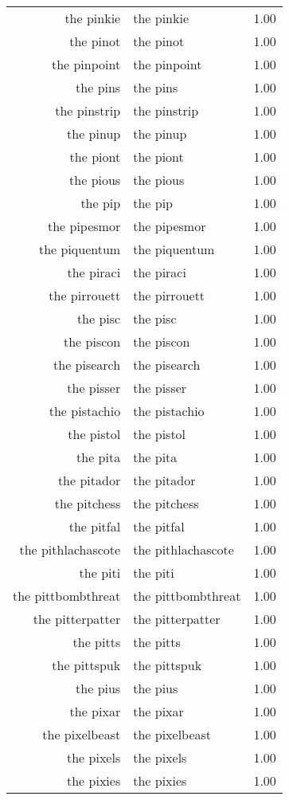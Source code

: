 \begin{table}[ht]
\begin{tabular}{rlr}
  the pinkie & the pinkie & 1.00 \\ 
  the pinot & the pinot & 1.00 \\ 
  the pinpoint & the pinpoint & 1.00 \\ 
  the pins & the pins & 1.00 \\ 
  the pinstrip & the pinstrip & 1.00 \\ 
  the pinup & the pinup & 1.00 \\ 
  the piont & the piont & 1.00 \\ 
  the pious & the pious & 1.00 \\ 
  the pip & the pip & 1.00 \\ 
  the pipesmor & the pipesmor & 1.00 \\ 
  the piquentum & the piquentum & 1.00 \\ 
  the piraci & the piraci & 1.00 \\ 
  the pirrouett & the pirrouett & 1.00 \\ 
  the pisc & the pisc & 1.00 \\ 
  the piscon & the piscon & 1.00 \\ 
  the pisearch & the pisearch & 1.00 \\ 
  the pisser & the pisser & 1.00 \\ 
  the pistachio & the pistachio & 1.00 \\ 
  the pistol & the pistol & 1.00 \\ 
  the pita & the pita & 1.00 \\ 
  the pitador & the pitador & 1.00 \\ 
  the pitchess & the pitchess & 1.00 \\ 
  the pitfal & the pitfal & 1.00 \\ 
  the pithlachascote & the pithlachascote & 1.00 \\ 
  the piti & the piti & 1.00 \\ 
  the pittbombthreat & the pittbombthreat & 1.00 \\ 
  the pitterpatter & the pitterpatter & 1.00 \\ 
  the pitts & the pitts & 1.00 \\ 
  the pittspuk & the pittspuk & 1.00 \\ 
  the pius & the pius & 1.00 \\ 
  the pixar & the pixar & 1.00 \\ 
  the pixelbeast & the pixelbeast & 1.00 \\ 
  the pixels & the pixels & 1.00 \\ 
  the pixies & the pixies & 1.00 \\ 

\end{tabular}
\end{table}
